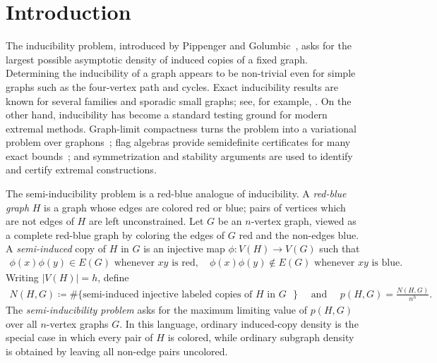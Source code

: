 \documentclass[10pt,a4paper]{article}
\begin{document}








\section{Introduction}\label{introduction}
The inducibility problem, introduced  by  Pippenger and Golumbic~\cite{PippengerGolumbic},  asks for the largest possible asymptotic density of induced copies of a fixed graph. Determining the inducibility of a graph appears to be non-trivial even for simple graphs such as the four-vertex path and cycles. Exact inducibility results are known for several families and sporadic small graphs; see, for example, \cite{BrownSidorenko1994,BollobasEgawaHarrisJin1995,
HatamiHirstNorine2014,BodnarPikhurko,BodnarGaoLeonLiuPikhurkoSun2026}. On the other hand, inducibility has become a standard testing ground for modern extremal methods. Graph-limit compactness turns the problem into a variational problem over graphons~\cite{LovaszSzegedy}; flag algebras provide semidefinite certificates
for many exact bounds~\cite{Razborov}; and symmetrization and stability
arguments are used to identify and certify extremal constructions. 




The semi-inducibility problem  is a red-blue analogue of inducibility. A \emph{red-blue graph} $H$ is a graph whose edges are colored red or blue; pairs of vertices which are not edges of $H$ are left unconstrained. Let $G$ be an $n$-vertex  graph, viewed as a complete red-blue graph by coloring the edges of $G$ red and the non-edges blue.  A \emph{semi-induced} copy of $H$ in $G$ is an injective map
$\phi:V(H)\to V(G)$ such that 
\begin{align*}
    \phi(x)\phi(y)\in E(G) \text{ whenever $xy$ is red},\quad\phi(x)\phi(y)\notin E(G) \text{ whenever $xy$ is blue.}
\end{align*}
Writing $|V(H)|=h$, define
\begin{align*}
    N(H,G)\coloneqq \#\{\text{semi-induced injective labeled copies of $H$ in $G$ }\}\quad \text{ and }\quad p(H,G)=\frac{N(H,G)}{n^h}.
\end{align*}
The  \emph{semi-inducibility problem} asks for the maximum limiting value of $p(H,G)$ over all $n$-vertex graphs $G$. In this language, ordinary induced-copy density is the special case in which
every pair of $H$ is colored, while ordinary subgraph density is obtained by
leaving all non-edge pairs uncolored.  
\end{document}
